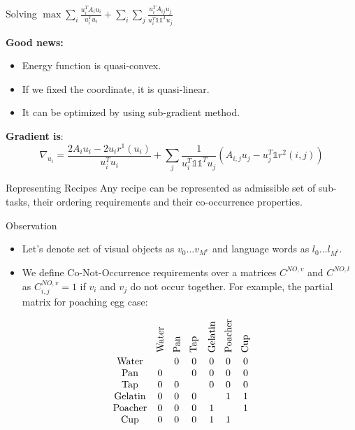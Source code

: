 \begin{frame}{\vspace{-8mm}\\ Solving $\max \sum_{i} \frac{u_i^TA_iu_i}{u_i^Tu_i} + \sum_{i}\sum_{j} \frac{u_i^TA_{ij}u_j}{u_i^T \mathds{1} \mathds{1}^Tu_j}$}

{\bf Good news:}
\begin{itemize}
\item Energy function is quasi-convex.
\item If we fixed the coordinate, it is quasi-linear.
\item It can be optimized by using sub-gradient method.
\end{itemize}

{\bf Gradient is}: \\
\[
\nabla_{u_i} = \frac{2A_i u_i -2u_ir^1(u_i)}{u_i^Tu_i} + \sum_j \frac{1}{u_i^T \mathds{1} \mathds{1}^T u_j} \left( A_{i,j}u_j - u_j^T \mathds{1} r^2(i,j) \right)
\]

\end{frame}



\begin{frame}{Representing Recipes}
Any recipe can be represented as admissible set of sub-tasks, their ordering requirements and their co-occurrence properties.
\end{frame}


\begin{frame}{Observation}
\begin{itemize}
\item Let's denote set of visual objects as $v_0 \ldots v_{M^v}$ and language words as $l_0 \ldots l_{M^l}$.
\item We define Co-Not-Occurrence requirements over a matrices $C^{NO,v}$ and $C^{NO,l}$ as $C^{NO,v}_{i,j} =1$ if $v_i$ and $v_j$ do not occur together. For example, the partial matrix for poaching egg case:
\end{itemize}
\[
 \begin{array}{ccccccc} 
&\rotatebox{90}{Water} & \rotatebox{90}{Pan} & \rotatebox{90}{Tap} & \rotatebox{90}{Gelatin} & \rotatebox{90}{Poacher} & \rotatebox{90}{Cup} \\ 
\text{Water} &  & 0 & 0 & 0 & 0 & 0 \\
\text{Pan} & 0 &  & 0 & 0 & 0 & 0 \\
\text{Tap} & 0 & 0 &  & 0 & 0 & 0 \\
\text{Gelatin} & 0 & 0 & 0 &  & 1 & 1 \\
\text{Poacher} & 0 & 0 & 0 & 1 &  & 1 \\
\text{Cup} & 0 & 0 & 0 & 1 & 1 & 
\end{array} 
\]
\end{frame}

